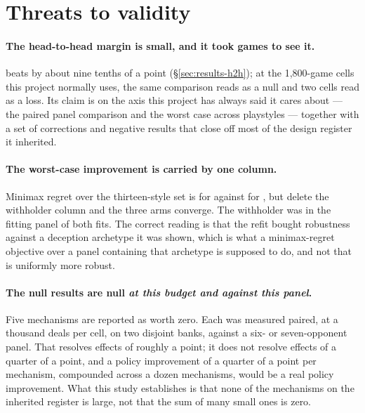 \section{Threats to validity}
\label{sec:limitations}

\paragraph{The head-to-head margin is small, and it took \vsixBigFiveN{} games to see it.}
\vsix{} beats \vfive{} by about nine tenths of a point (\S\ref{sec:results-h2h}); at the
1{,}800-game cells this project normally uses, the same comparison reads as a null and two cells read
as a loss. Its claim is on the axis this project has always said it
cares about --- the paired panel comparison and the worst case across playstyles --- together with a
set of corrections and negative results that close off most of the design register it inherited.

\paragraph{The worst-case improvement is carried by one column.} Minimax regret over the
thirteen-style set is \vsixPoolRegretSix{} for \vsix{} against \vsixPoolRegretFive{} for \vfive{}, but
delete the withholder column and the three arms converge. The withholder was in the fitting panel
of both fits. The correct reading is that the refit bought robustness against a deception archetype
it was shown, which is what a minimax-regret objective over a panel containing that archetype is
supposed to do, and not that \vsix{} is uniformly more robust.

\paragraph{The null results are null \emph{at this budget and against this panel}.}
Five mechanisms are reported as worth zero. Each was measured paired, at a thousand deals per cell,
on two disjoint banks, against a six- or seven-opponent panel. That resolves effects of roughly a
point; it does not resolve effects of a quarter of a point, and a policy improvement of a quarter of
a point per mechanism, compounded across a dozen mechanisms, would be a real policy improvement.
What this study establishes is that none of the mechanisms on the inherited register is large, not
that the sum of many small ones is zero.

